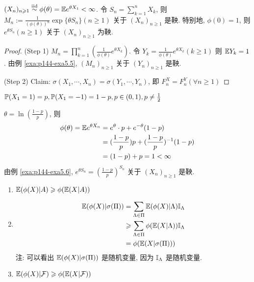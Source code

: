 \begin{example}[指数鞅]\label{exa:p144-exa5.6}
    $(X_n)_{n\geqslant 1}\overset{\text{iid}}{\sim}\phi(\theta)=\mathbb E e^{\theta X_1}<\infty$. 令 $S_n=\sum_{k=1}^n X_k$, 则 $\displaystyle M_n:=\frac{1}{(\phi(\theta))^n}\exp\{\theta S_n\}(n\geq 1)$ 关于 $(X_n)_{n\geq 1}$ 是鞅. 特别地, $\phi(0)=1$, 则 $e^{\theta S_n}(n\geq 1)$ 关于 $(X_n)_{n\geq 1}$ 为鞅.
\end{example}

\begin{proof}
    (Step 1) $\displaystyle M_n=\prod_{k=1}^n (\frac{1}{\phi(\theta)}e^{\theta X_k})$. 令 $Y_k=\frac{1}{\phi(\theta)}e^{\theta X_k}(k\geq 1)$ 则 $\mathbb E Y_k=1$. 由例 \ref{exa:p144-exa5.5}, $(M_n)_{n\geq 1}$ 关于 $(Y_n)_{n\geq 1}$ 是鞅.

    (Step 2) Claim: $\sigma(X_1,\cdots,X_n)=\sigma(Y_1,\cdots,Y_n)$, 即 $F_n^X=F_n^Y(\forall n\geq 1)$
\end{proof}

\begin{example}[赌徒破产]\label{exa:p145-exa5.3}
    $\mathbb{P}(X_1=1)=p, \mathbb{P}(X_1=-1)=1-p,p\in (0,1),p\neq \frac{1}{2}$
\end{example}

$\theta=\ln(\frac{1-p}{p})$, 则
\[
\begin{aligned}
    \phi(\theta)=\mathbb E e^{\theta X_n}&=e^{\theta}\cdot p+e^{-\theta}(1-p)\\
    &=(\frac{1-p}{p})p+(\frac{1-p}{p})^{-1}(1-p)\\
    &=(1-p)+p=1<\infty
\end{aligned}
\]
由例 \ref{exa:p144-exa5.6}, $e^{\theta S_n}=(\frac{1-p}{p})^{S_n}$ 关于 $(X_n)_{n\geq 1}$ 是鞅.

\begin{lemma}[Jensen不等式]
    \begin{enumerate}
        \item $\mathbb E (\phi(X)|A)\geqslant \phi(\mathbb E(X|A))$
        \item \[
            \begin{aligned}
                \mathbb E(\phi(X)|\sigma(\Pi))&=\sum_{\Lambda\in \Pi}\mathbb E(\phi(X)|\Lambda)\mathbb I_{\Lambda}\\
                &\geqslant \sum_{\Lambda\in \Pi} \phi(\mathbb E(X|\Lambda))\mathbb I_{\Lambda}\\
                &=\phi(\mathbb E(X|\sigma(\Pi)))
            \end{aligned}
        \]
        注: 可以看出 $\mathbb E(\phi(X)|\sigma(\Pi))$ 是随机变量, 因为 $\mathbb I_{\Lambda}$ 是随机变量.
        \item $\mathbb E(\phi(X)|\mathcal{F})\geqslant \phi(\mathbb E(X|\mathcal{F}))$
    \end{enumerate}
\end{lemma}

